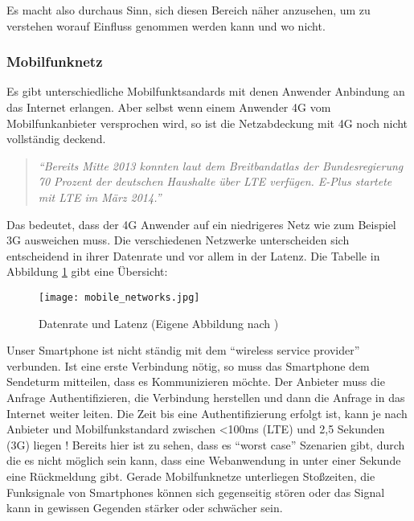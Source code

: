 		Es macht also durchaus Sinn, sich diesen Bereich näher anzusehen, um zu verstehen worauf Einfluss genommen werden kann und wo nicht.

		\subsubsection{Mobilfunknetz} %
		\label{ssub:Mobilfunknetz}
			Es gibt unterschiedliche Mobilfunktsandards mit denen Anwender Anbindung an das Internet erlangen. Aber selbst wenn einem Anwender 4G vom Mobilfunkanbieter versprochen wird, so ist die Netzabdeckung mit 4G noch nicht vollständig deckend.
			\begin{quote}
				\textit{"`Bereits Mitte 2013 konnten laut dem Breitbandatlas der Bundesregierung 70 Prozent der deutschen Haushalte über LTE verfügen. E-Plus startete mit LTE im März 2014."' \autocite{netzagentur}}
			\end{quote}

			Das bedeutet, dass der 4G Anwender auf ein niedrigeres Netz wie zum Beispiel 3G ausweichen muss. Die verschiedenen Netzwerke unterscheiden sich entscheidend in ihrer Datenrate und vor allem in der Latenz. Die Tabelle in Abbildung \ref{fig:mobile_networks} gibt eine Übersicht:

			\begin{figure}[htbp]
				\begin{center}
					\texttt{[image: mobile\_networks.jpg]}
					\caption{Datenrate und Latenz (Eigene Abbildung nach \autocite{grigorikGNetwork})}
					\label{fig:mobile_networks}
				\end{center}
			\end{figure}

			Unser Smartphone ist nicht ständig mit dem "`wireless service provider"' verbunden. Ist eine erste Verbindung nötig, so muss das Smartphone dem Sendeturm mitteilen, dass es Kommunizieren möchte. Der Anbieter muss die Anfrage Authentifizieren, die Verbindung herstellen und dann die Anfrage in das Internet weiter leiten. Die Zeit bis eine Authentifizierung erfolgt ist, kann je nach Anbieter und Mobilfunkstandard zwischen <100ms (LTE) und 2,5 Sekunden (3G) liegen \autocite{grigorikRadio}! Bereits hier ist zu sehen, dass es "`worst case"' Szenarien gibt, durch die es nicht möglich sein kann, dass eine Webanwendung in unter einer Sekunde eine Rückmeldung gibt. Gerade Mobilfunknetze unterliegen Stoßzeiten, die Funksignale von Smartphones können sich gegenseitig stören oder das Signal kann in gewissen Gegenden stärker oder schwächer sein.

